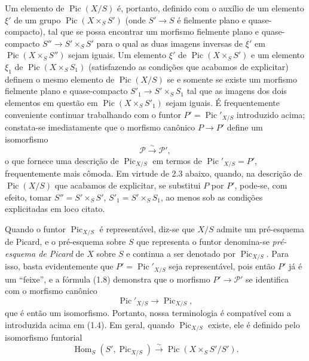 Um elemento de $\operatorname{Pic}(X/S)$ é, portanto, definido com o auxílio de
um elemento $\xi'$ de um grupo $\operatorname{Pic}(X\times_SS')$ (onde
$S'\longrightarrow S$ é fielmente plano e quase-compacto), tal que se possa
encontrar um morfismo fielmente plano e quase-compacto
$S''\longrightarrow S'\times_SS'$ para o qual as duas imagens inversas de
$\xi'$ em $\operatorname{Pic}(X\times_SS'')$ sejam iguais. Um elemento $\xi'$
de $\operatorname{Pic}(X\times_SS')$ e um elemento $\xi_1$ de
$\operatorname{Pic}(X\times_SS_1)$ (satisfazendo as condições que acabamos de
explicitar) definem o mesmo elemento de $\operatorname{Pic}(X/S)$ se e somente
se existe um morfismo fielmente plano e quase-compacto
$S'_1\longrightarrow S'\times_SS_1$ tal que as imagens dos dois elementos em
questão em $\operatorname{Pic}(X\times_SS'_1)$ sejam iguais. É frequentemente
conveniente continuar trabalhando com o funtor
$P'=\operatorname{Pic}'_{X/S}$ introduzido acima; constata-se imediatamente que
o morfismo canônico $P\longrightarrow P'$ define um isomorfismo
\begin{equation}
\mathcal P\xrightarrow{\sim}\mathcal P',
\tag{1.8}
\end{equation}
o que fornece uma descrição de $\operatorname{Pic}_{X/S}$ em termos de
$\operatorname{Pic}'_{X/S}=P'$, frequentemente mais cômoda. Em virtude de 2.3
abaixo, quando, na descrição de $\operatorname{Pic}(X/S)$ que acabamos de
explicitar, se substitui $P$ por $P'$, pode-se, com efeito,
tomar $S''=S'\times_SS'$, $S'_1=S'\times_SS_1$, ao menos sob as condições
explicitadas em loco citato.

Quando o funtor $\operatorname{Pic}_{X/S}$ é representável, diz-se que $X/S$
admite um pré-esquema de Picard, e o pré-esquema sobre $S$ que representa o
funtor denomina-se \emph{pré-esquema de Picard} de $X$ sobre $S$ e continua a
ser denotado por $\operatorname{Pic}_{X/S}$. Para isso, basta evidentemente que
$P'=\operatorname{Pic}'_{X/S}$ seja representável, pois então $P'$ já é um
``feixe'', e a fórmula (1.8) demonstra que o morfismo
$P'\longrightarrow\mathcal P'$ se identifica com o morfismo canônico
\begin{equation}
\operatorname{Pic}'_{X/S}\longrightarrow\operatorname{Pic}_{X/S},
\tag{1.9}
\end{equation}
que é então um isomorfismo. Portanto, nossa terminologia é compatível com a
introduzida acima em (1.4). Em geral, quando $\operatorname{Pic}_{X/S}$ existe,
ele é definido pelo isomorfismo funtorial
\begin{equation}
\operatorname{Hom}_S(S',\operatorname{Pic}_{X/S})\xrightarrow{\sim}
\operatorname{Pic}(X\times_SS'/S').
\tag{1.10}
\end{equation}

